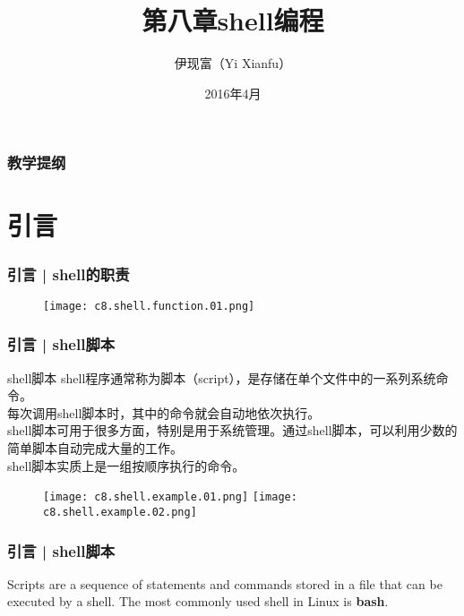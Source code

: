 



\title[shell编程]{第八章\quad shell编程}
\author[Yixf]{伊现富（Yi Xianfu）}
\date{2016年4月}


\begin{frame}
  \titlepage
\end{frame}

\begin{frame}[plain,label=current]
  \frametitle{教学提纲}
  \setcounter{tocdepth}{3}
  \begin{multicols}{2}
    \tableofcontents
  \end{multicols}
\end{frame}


\section{引言}
\begin{frame}
  \frametitle{引言 | shell的职责}
  \begin{figure}
    \centering
    \texttt{[image: c8.shell.function.01.png]}
  \end{figure}
\end{frame}

\begin{frame}
  \frametitle{引言 | shell脚本}
  \begin{block}{shell脚本}
    shell程序通常称为脚本（script），是存储在单个文件中的一系列系统命令。\\
    每次调用shell脚本时，其中的命令就会自动地依次执行。\\
    shell脚本可用于很多方面，特别是用于系统管理。通过shell脚本，可以利用少数的简单脚本自动完成大量的工作。\\
    shell脚本实质上是一组按顺序执行的命令。
  \end{block}
  \begin{figure}
    \centering
    \texttt{[image: c8.shell.example.01.png]}
    \texttt{[image: c8.shell.example.02.png]}
  \end{figure}
\end{frame}

\begin{frame}
  \frametitle{引言 | shell脚本}
  Scripts are a sequence of statements and commands stored in a file that can be executed by a shell. The most commonly used shell in Linux is \textbf{bash}.
\end{frame}


